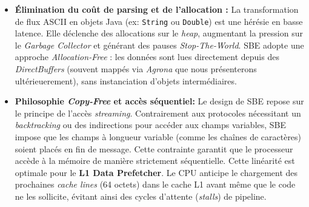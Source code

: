 \begin{itemize}
    \item \textbf{Élimination du coût de parsing et de l'allocation :} 
    La transformation de flux ASCII en objets Java (ex: \texttt{String} ou \texttt{Double}) est une hérésie en basse latence. Elle déclenche des allocations sur le \textit{heap}, augmentant la pression sur le \textit{Garbage Collector} et générant des pauses \textit{Stop-The-World}. SBE adopte une approche \textit{Allocation-Free} : les données sont lues directement depuis des \textit{DirectBuffers} (souvent mappés via \textit{Agrona} que nous présenterons ultérieuerement), sans instanciation d'objets intermédiaires. 
    
    \item \textbf{Philosophie \textit{Copy-Free} et accès séquentiel:} 
    Le design de SBE repose sur le principe de l'accès \textit{streaming}. Contrairement aux protocoles nécessitant un \textit{backtracking} ou des indirections pour accéder aux champs variables, SBE impose que les champs à longueur variable (comme les chaînes de caractères) soient placés en fin de message. Cette contrainte garantit que le processeur accède à la mémoire de manière strictement séquentielle. Cette linéarité est optimale pour le \textbf{L1 Data Prefetcher}. Le CPU anticipe le chargement des prochaines \textit{cache lines} (64 octets) dans le cache L1 avant même que le code ne les sollicite, évitant ainsi des cycles d'attente (\textit{stalls}) de pipeline.
\end{itemize}